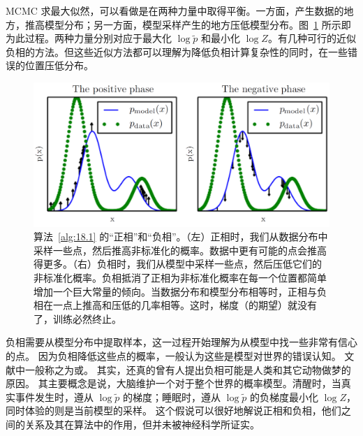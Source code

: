 MCMC 求最大似然，可以看做是在两种力量中取得平衡。一方面，产生数据的地方，推高模型分布；另一方面，模型采样产生的地方压低模型分布。图~\ref{fig:18.1} 所示即为此过程。两种力量分别对应于最大化 \(\log\widetilde{p}\) 和最小化 \(\log Z\)。有几种可行的近似负相的方法。但这些近似方法都可以理解为降低负相计算复杂性的同时，在一些错误的位置压低分布。

\begin{figure}[htbp] %
   \centering
   \includegraphics[width=\textwidth]{fig/chap18/18_1.png} 
   \caption{算法~\ref{alg:18.1} 的``正相''和``负相''。（左）正相时，我们从数据分布中采样一些点，然后推高非标准化的概率。数据中更有可能的点会推高得更多。（右）负相时，我们从模型中采样一些点，然后压低它们的非标准化概率。负相抵消了正相为非标准化概率在每一个位置都简单增加一个巨大常量的倾向。当数据分布和模型分布相等时，正相与负相在一点上推高和压低的几率相等。这时，梯度（的期望）就没有了，训练必然终止。}
   \label{fig:18.1}
\end{figure}

负相需要从模型分布中提取样本，这一过程开始理解为从模型中找一些非常有信心的点。
因为负相降低这些点的概率，一般认为这些是模型对世界的错误认知。
文献中一般称之为或。
其实，还真的曾有人提出负相可能是人类和其它动物做梦的原因。
其主要概念是说，大脑维护一个对于整个世界的概率模型。清醒时，当真实事件发生时，遵从 \(\log\widetilde{p}\) 的梯度；睡眠时，遵从 \(\log\widetilde{p}\) 的负梯度最小化 \(\log Z\)，同时体验的则是当前模型的采样。
这个假说可以很好地解说正相和负相，他们之间的关系及其在算法中的作用，但并未被神经科学所证实。


